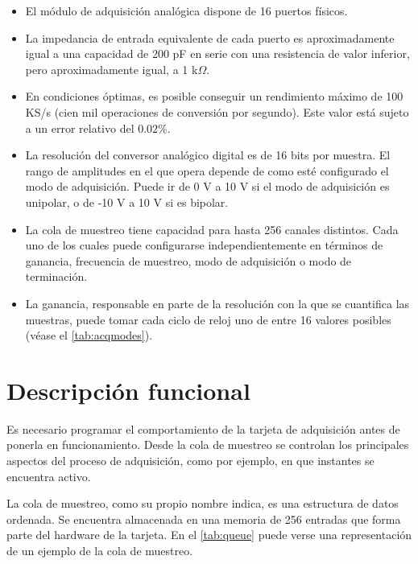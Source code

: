 \begin{itemize}
	\item El módulo de adquisición analógica dispone de 16 puertos
		físicos.
	\item La impedancia de entrada equivalente de cada puerto es
		aproximadamente igual a una capacidad de 200 pF en serie
		con una resistencia de valor inferior, pero aproximadamente
		igual, a 1 k$\Omega$.
	\item En condiciones óptimas, es posible conseguir un rendimiento
		máximo de 100 KS/s (cien mil operaciones de conversión por
		segundo). Este valor está sujeto a un error relativo del
		$0.02\%$.
	\item La resolución del conversor analógico digital es de 16 bits
		por muestra. El rango de amplitudes en el que opera depende
		de como esté configurado el modo de adquisición. Puede ir
		de 0 V a 10 V si el modo de adquisición es unipolar, o de
		-10 V a 10 V si es bipolar.
	\item La cola de muestreo tiene capacidad para hasta 256 canales
		distintos. Cada uno de los cuales puede configurarse
		independientemente en términos de ganancia, frecuencia de
		muestreo, modo de adquisición o modo de terminación.
	\item La ganancia, responsable en parte de la resolución con la que
		se cuantifica las muestras, puede tomar cada ciclo de reloj
		uno de entre 16 valores posibles (véase el
		\vref{tab:acqmodes}).
\end{itemize}


\section{Descripción funcional}\label{sec:funcdesc}

Es necesario programar el comportamiento de la tarjeta de adquisición antes
de ponerla en funcionamiento. Desde la cola de muestreo se controlan los
principales aspectos del proceso de adquisición, como por ejemplo, en que
instantes se encuentra activo.

La cola de muestreo, como su propio nombre indica, es una estructura de
datos ordenada. Se encuentra almacenada en una memoria  de 256
entradas que forma parte del hardware de la tarjeta. En el \cref{tab:queue}
puede verse una representación de un ejemplo de la cola de muestreo.

